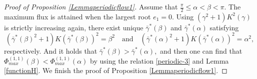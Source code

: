 \documentclass[reqno,12pt]{amsart}
\begin{document}
\begin{proof}[Proof of Proposition \ref{Lemmaperiodicflow1}]
    Assume that  $\frac{\pi}{2} \leq \alpha < \beta < \pi$. The maximum flux is attained when the largest root $e_1 = 0$. 
  Using $( {\gamma}^2 +1)K^2( {\gamma})$ is strictly increasing again,
    there exist unique $\bar{\gamma}^*(\beta)$ and $\bar{\gamma}^*(\alpha)$ satisfying
\begin{equation}\nonumber
( \bar{\gamma}^*(\beta)^2+1)K( \bar{\gamma}^*(\beta))^2 = \beta^2\quad \text{and}\quad 
( \bar{\gamma}^*(\alpha)^2 + 1) K( \bar{\gamma}^*(\alpha))^2 = \alpha^2,
\end{equation}
respectively. 
And it holds that $ \bar{\gamma}^*(\beta) >  \bar{\gamma}^*(\alpha),$  and then one can find that $\Phi_{max}^{(1,1)}(\beta)< \Phi_{max}^{(1,1)}(\alpha)$ by using the relation \eqref{periodic-3} and Lemma \ref{functionH}.
We finish the proof of Proposition \ref{Lemmaperiodicflow1}. 
\end{proof}








\end{document}
